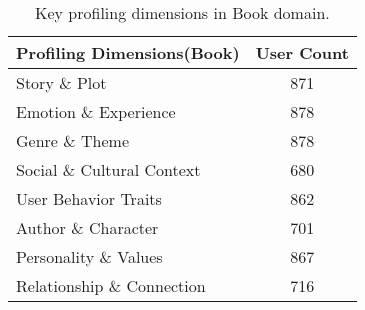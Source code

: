 \renewcommand{\arraystretch}{0.9} %


\begin{table}[h]
\centering
\footnotesize
\begin{tabular}{lc}
\toprule
Profiling Dimensions(Book) & User Count \\
\midrule
Story \& Plot & 871\\
Emotion \& Experience & 878\\
Genre \& Theme & 878\\
Social \& Cultural Context & 680\\
User Behavior Traits & 862\\
Author \& Character & 701\\
Personality \& Values & 867\\
Relationship \& Connection & 716\\
\bottomrule
\end{tabular}
\caption{Key profiling dimensions in Book domain.}
\label{tab:book_dimensions} 
\end{table}
